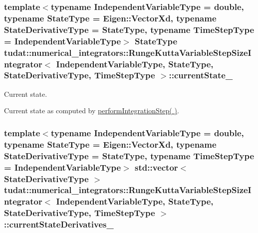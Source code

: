 \subsubsection[{\texorpdfstring{current\+State\+\_\+}{currentState_}}]{\setlength{\rightskip}{0pt plus 5cm}template$<$typename Independent\+Variable\+Type  = double, typename State\+Type  = Eigen\+::\+Vector\+Xd, typename State\+Derivative\+Type  = State\+Type, typename Time\+Step\+Type  = Independent\+Variable\+Type$>$ State\+Type {\bf tudat\+::numerical\+\_\+integrators\+::\+Runge\+Kutta\+Variable\+Step\+Size\+Integrator}$<$ Independent\+Variable\+Type, State\+Type, State\+Derivative\+Type, Time\+Step\+Type $>$\+::current\+State\+\_\+\hspace{0.3cm}{\ttfamily [protected]}}\hypertarget{classtudat_1_1numerical__integrators_1_1RungeKuttaVariableStepSizeIntegrator_a17dc1f0cc72f56c31931142f8d8b87eb}{}\label{classtudat_1_1numerical__integrators_1_1RungeKuttaVariableStepSizeIntegrator_a17dc1f0cc72f56c31931142f8d8b87eb}


Current state. 

Current state as computed by \hyperlink{classtudat_1_1numerical__integrators_1_1RungeKuttaVariableStepSizeIntegrator_a34e884253297c9bfb17d756c36510cc4}{perform\+Integration\+Step( )}. 
\subsubsection[{\texorpdfstring{current\+State\+Derivatives\+\_\+}{currentStateDerivatives_}}]{\setlength{\rightskip}{0pt plus 5cm}template$<$typename Independent\+Variable\+Type  = double, typename State\+Type  = Eigen\+::\+Vector\+Xd, typename State\+Derivative\+Type  = State\+Type, typename Time\+Step\+Type  = Independent\+Variable\+Type$>$ std\+::vector$<$ State\+Derivative\+Type $>$ {\bf tudat\+::numerical\+\_\+integrators\+::\+Runge\+Kutta\+Variable\+Step\+Size\+Integrator}$<$ Independent\+Variable\+Type, State\+Type, State\+Derivative\+Type, Time\+Step\+Type $>$\+::current\+State\+Derivatives\+\_\+\hspace{0.3cm}{\ttfamily [protected]}}\hypertarget{classtudat_1_1numerical__integrators_1_1RungeKuttaVariableStepSizeIntegrator_a3c76b8be3eea0bd6c4d31a8aae391030}{}\label{classtudat_1_1numerical__integrators_1_1RungeKuttaVariableStepSizeIntegrator_a3c76b8be3eea0bd6c4d31a8aae391030}


